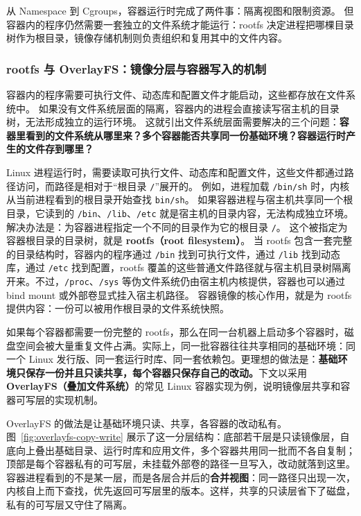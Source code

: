 从 Namespace 到 Cgroups，容器运行时完成了两件事：隔离视图和限制资源。
但容器内的程序仍然需要一套独立的文件系统才能运行：rootfs 决定进程把哪棵目录树作为根目录，镜像存储机制则负责组织和复用其中的文件内容。

\subsubsection{rootfs 与 OverlayFS：镜像分层与容器写入的机制}

容器内的程序需要可执行文件、动态库和配置文件才能启动，这些都存放在文件系统中。
如果没有文件系统层面的隔离，容器内的进程会直接读写宿主机的目录树，无法形成独立的运行环境。
这就引出文件系统层面需要解决的三个问题：\textbf{容器里看到的文件系统从哪里来？多个容器能否共享同一份基础环境？容器运行时产生的文件存到哪里？}

Linux 进程运行时，需要读取可执行文件、动态库和配置文件，这些文件都通过路径访问，而路径是相对于“根目录 \texttt{/}”展开的。
例如，进程加载 \texttt{/bin/sh} 时，内核从当前进程看到的根目录开始查找 \texttt{bin/sh}。
如果容器进程与宿主机共享同一个根目录，它读到的 \texttt{/bin}、\texttt{/lib}、\texttt{/etc} 就是宿主机的目录内容，无法构成独立环境。
解决办法是：为容器进程指定一个不同的目录作为它的根目录 \texttt{/}。
这个被指定为容器根目录的目录树，就是 \textbf{rootfs（root filesystem）}。
当 rootfs 包含一套完整的目录结构时，容器内的程序通过 \texttt{/bin} 找到可执行文件，通过 \texttt{/lib} 找到动态库，通过 \texttt{/etc} 找到配置，rootfs 覆盖的这些普通文件路径就与宿主机目录树隔离开来。不过，\texttt{/proc}、\texttt{/sys} 等伪文件系统仍由宿主机内核提供，容器也可以通过 bind mount 或外部卷显式挂入宿主机路径。
容器镜像的核心作用，就是为 rootfs 提供内容：一份可以被用作根目录的文件系统快照。

如果每个容器都需要一份完整的 rootfs，那么在同一台机器上启动多个容器时，磁盘空间会被大量重复文件占满。实际上，同一批容器往往共享相同的基础环境：同一个 Linux 发行版、同一套运行时库、同一套依赖包。更理想的做法是：\textbf{基础环境只保存一份并且只读共享，每个容器只保存自己的改动。}下文以采用 \textbf{OverlayFS（叠加文件系统）}的常见 Linux 容器实现为例，说明镜像层共享和容器可写层的实现机制。

OverlayFS 的做法是让基础环境只读、共享，各容器的改动私有。图~\ref{fig:overlayfs-copy-write} 展示了这一分层结构：底部若干层是只读镜像层，自底向上叠出基础目录、运行时库和应用文件，多个容器共用同一批而不各自复制；顶部是每个容器私有的可写层，未挂载外部卷的路径一旦写入，改动就落到这里。容器进程看到的不是某一层，而是各层合并后的\textbf{合并视图}：同一路径只出现一次，内核自上而下查找，优先返回可写层里的版本。这样，共享的只读层省下了磁盘，私有的可写层又守住了隔离。

